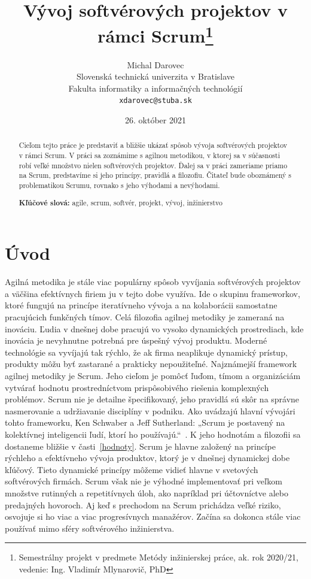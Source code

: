 \documentclass[10pt,slovak,a4paper]{article}
\title{Vývoj softvérových projektov v rámci Scrum\thanks{Semestrálny projekt v predmete Metódy inžinierskej práce, ak. rok 2020/21, vedenie: Ing. Vladimír Mlynarovič, PhD}} %
\author{Michal Darovec\\[2pt]
	{\small Slovenská technická univerzita v Bratislave}\\
	{\small Fakulta informatiky a informačných technológií}\\
	{\small \texttt{xdarovec@stuba.sk}}
	}
\date{\small 26. október 2021} %
\begin{document}
\maketitle

\begin{abstract}
Cieľom tejto práce je predstaviť a bližšie ukázať spôsob vývoja softvérových projektov v rámci Scrum. V práci sa zoznámime s agilnou metodikou, v ktorej sa v súčasnosti robí veľké množstvo nielen softvérových projektov. Ďalej sa v práci zameriame priamo na Scrum, predstavíme si jeho princípy, pravidlá a filozofiu. Čitateľ bude oboznámený s problematikou Scrumu, rovnako s jeho výhodami a nevýhodami.

\textbf{Kľúčové slová:} agile, scrum, softvér, projekt, vývoj, inžinierstvo
\end{abstract}



\section{Úvod}

Agilná metodika je stále viac populárny spôsob vyvíjania softvérových projektov a väčšina efektívnych firiem ju v tejto dobe využíva. Ide o skupinu frameworkov, ktoré fungujú na princípe iteratívneho vývoja a na kolaborácii samostatne pracujúcich funkčných tímov.
Celá filozofia agilnej metodiky je zameraná na inováciu. Ľudia v dnešnej dobe pracujú vo vysoko dynamických prostrediach, kde inovácia je nevyhnutne potrebná pre úspešný vývoj produktu. Moderné technológie sa vyvíjajú tak rýchlo, že ak firma neaplikuje dynamický prístup, produkty môžu byť zastarané a prakticky nepoužiteľné.
Najznámejší framework agilnej metodiky je Scrum. Jeho cieľom je pomôcť ľuďom, tímom a organizáciám vytvárať hodnotu prostredníctvom prispôsobivého riešenia komplexných problémov. Scrum nie je detailne špecifikovaný, jeho pravidlá sú skôr na správne nasmerovanie a udržiavanie disciplíny v podniku. Ako uvádzajú hlavní vývojári tohto frameworku, Ken Schwaber a Jeff Sutherland: „Scrum je postavený na kolektívnej inteligencii ľudí, ktorí ho používajú.“~\cite{schwaber2020scrum}. K jeho hodnotám a filozofii sa dostaneme bližšie v časti~\ref{hodnoty}.
Scrum je hlavne založený na princípe rýchleho a efektívneho vývoja produktov, ktorý je v dnešnej dynamickej dobe kľúčový. Tieto dynamické princípy môžeme vidieť hlavne v svetových softvérových firmách. Scrum však nie je výhodné implementovať pri veľkom množstve rutinných a repetitívnych úloh, ako napríklad pri účtovníctve alebo predajných hovoroch. Aj keď s prechodom na Scrum prichádza veľké riziko, osvojuje si ho viac a viac progresívnych manažérov. Začína sa dokonca stále viac používať mimo sféry softvérového inžinierstva.
\end{document}
